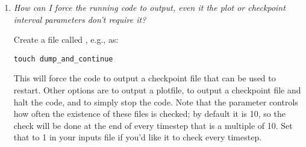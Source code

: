 \begin{enumerate}

\item {\em How can I force the running code to output, even it the plot or
 checkpoint interval parameters don't require it?}

Create a file called , e.g., as:
\begin{verbatim}
touch dump_and_continue
\end{verbatim}

This will force the code to output a checkpoint file that can be used
to restart.  Other options are  to output
a plotfile,  to output a checkpoint file
and halt the code, and  to simply stop the code.
Note that the parameter  controls how often
the existence of these files is checked; by default it is 10, so the
check will be done at the end of every timestep that is a multiple of 10.
Set that to 1 in your inputs file if you'd like it to check every timestep.




\end{enumerate}
